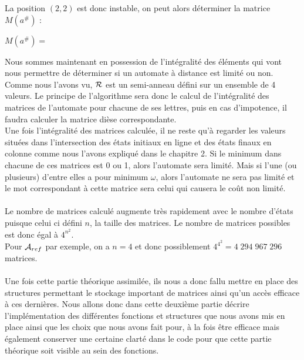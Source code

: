 \documentclass{report}
\begin{document}
La position $(2,2)$ est donc instable, on peut alors déterminer la matrice $M(a^{\#})$ :
\begin{center}
$M(a^{\#})=$
\end{center}
$ $\\
Nous sommes maintenant en possession de l'intégralité des éléments qui vont nous permettre de déterminer si un automate à distance est limité ou non. Comme nous l'avons vu, $\mathcal{R}$ est un semi-anneau défini sur un ensemble de 4 valeurs. Le principe de l'algorithme sera donc le calcul de l'intégralité des matrices de l'automate pour chacune de ses lettres, puis en cas d'impotence, il faudra calculer la matrice dièse correspondante.\\
Une fois l'intégralité des matrices calculée, il ne reste qu'à regarder les valeurs situées dans l'intersection des états initiaux en ligne et des états finaux en colonne comme nous l'avons expliqué dans le chapitre 2. Si le minimum dans chacune de ces matrices est 0 ou 1, alors l'automate sera limité. Mais si l'une (ou plusieurs) d'entre elles a pour minimum $\omega$, alors l'automate ne sera pas limité et le mot correspondant à cette matrice sera celui qui causera le coût non limité.\\\\
Le nombre de matrices calculé augmente très rapidement avec le nombre d'états puisque celui ci défini $n$, la taille des matrices. Le nombre de matrices possibles est donc égal à $4^{n^{2}}$.\\
Pour $\mathcal{A}_{ref}$ par exemple, on a $n=4$ et donc possiblement $4^{4^{2}} = 4\;294\;967\;296$ matrices.\\\\

Une fois cette partie théorique assimilée, ils nous a donc fallu mettre en place des structures permettant le stockage important de matrices ainsi qu'un accès efficace à ces dernières. Nous allons donc dans cette deuxième partie décrire l'implémentation des différentes fonctions et structures que nous avons mis en place ainsi que les choix que nous avons fait pour, à la fois être efficace mais également conserver une certaine clarté dans le code pour que cette partie théorique soit visible au sein des fonctions. 
\end{document}
